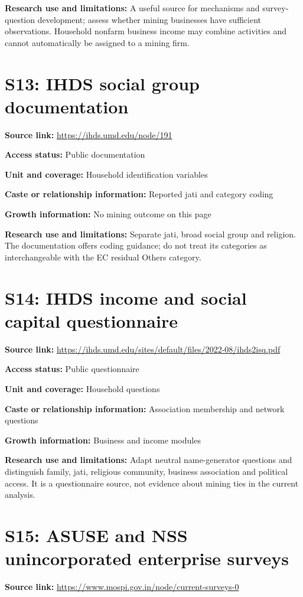 \documentclass[11pt,a4paper]{report}
\begin{document}
\textbf{Research use and limitations:} A useful source for mechanisms and survey-question development; assess whether mining businesses have sufficient observations. Household nonfarm business income may combine activities and cannot automatically be assigned to a mining firm.

\section{S13: IHDS social group documentation}\hypertarget{S13}{}
\textbf{Source link:} \url{https://ihds.umd.edu/node/191}

\textbf{Access status:} Public documentation

\textbf{Unit and coverage:} Household identification variables

\textbf{Caste or relationship information:} Reported jati and category coding

\textbf{Growth information:} No mining outcome on this page

\textbf{Research use and limitations:} Separate jati, broad social group and religion. The documentation offers coding guidance; do not treat its categories as interchangeable with the EC residual Others category.

\section{S14: IHDS income and social capital questionnaire}\hypertarget{S14}{}
\textbf{Source link:} \url{https://ihds.umd.edu/sites/default/files/2022-08/ihds2isq.pdf}

\textbf{Access status:} Public questionnaire

\textbf{Unit and coverage:} Household questions

\textbf{Caste or relationship information:} Association membership and network questions

\textbf{Growth information:} Business and income modules

\textbf{Research use and limitations:} Adapt neutral name-generator questions and distinguish family, jati, religious community, business association and political access. It is a questionnaire source, not evidence about mining ties in the current analysis.

\section{S15: ASUSE and NSS unincorporated enterprise surveys}\hypertarget{S15}{}
\textbf{Source link:} \url{https://www.mospi.gov.in/node/current-surveys-0}
\end{document}
